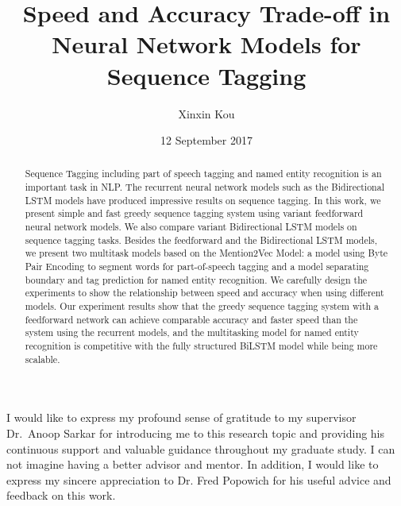 \documentclass{sfuthesis}
\title{Speed and Accuracy Trade-off in Neural Network Models for Sequence Tagging}
\author{Xinxin Kou}
\date{12 September 2017}
\begin{document}
\frontmatter
\maketitle{}

\begin{abstract}
Sequence Tagging including part of speech tagging and named entity recognition is an important task in NLP. The recurrent neural network models such as the Bidirectional LSTM models have produced impressive results on sequence tagging. In this work, we present simple and fast greedy sequence tagging system using variant feedforward neural network models. We also compare variant Bidirectional LSTM models on sequence tagging tasks. Besides the feedforward and the Bidirectional LSTM models, we present two multitask models based on the Mention2Vec Model: a model using Byte Pair Encoding to segment words for part-of-speech tagging and a model separating boundary and tag prediction for named entity recognition. We carefully design the experiments to show the relationship between speed and accuracy when using different models. Our experiment results show that the greedy sequence tagging system with a feedforward network can achieve comparable accuracy and faster speed than the system using the recurrent models, and the multitasking model for named entity recognition is competitive with the fully structured BiLSTM model while being more scalable.

\end{abstract}


\begin{acknowledgements} %

I would like to express my profound sense of gratitude to my supervisor Dr.\ Anoop Sarkar for introducing me to this research
topic and providing his continuous support and valuable guidance throughout my graduate study. I can not imagine having a better advisor and mentor. In addition, I would like to express my sincere appreciation to Dr. Fred Popowich for his useful advice and feedback on this work.




\end{acknowledgements}

\tableofcontents\clearpage
{}\listoftables\clearpage
{}\listoffigures





%
%
\end{document}
